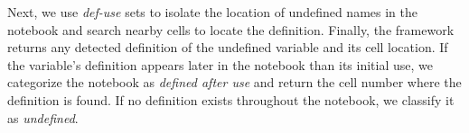         Next, we use {\em def-use} sets to isolate the location of undefined names in the notebook and search nearby cells to locate the definition. Finally, the framework returns any detected definition of the undefined variable and its cell location. If the variable's definition appears later in the notebook than its initial use, we categorize the notebook as {\em defined after use} and return the cell number where the definition is found. If no definition exists throughout the notebook, we classify it as {\em undefined}. 

        

    



